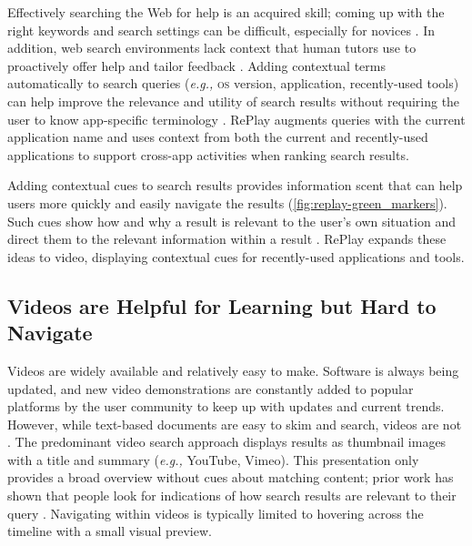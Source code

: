 Effectively searching the Web for help is an acquired skill; coming up with the right keywords and search settings can be difficult, especially for novices \cite{Russell2011}. In addition, web search environments lack context that human tutors use to proactively offer help and tailor feedback \cite{Schon1983}. Adding contextual terms automatically to search queries (\textit{e.g.,} \textsc{os} version, application, recently-used tools) can help improve the relevance and utility of search results without requiring the user to know app-specific terminology \cite{Ekstrand2011, Brandt2010, Matejka2011a}. RePlay augments queries with the current application name and uses context from both the current and recently-used applications to support cross-app activities when ranking search results.

Adding contextual cues to search results provides information scent that can help users more quickly and easily navigate the results (\autoref{fig:replay-green_markers}). Such cues show how and why a result is relevant to the user's own situation and direct them to the relevant information within a result \cite{Ekstrand2011, Fourney2014Intertwine}. RePlay expands these ideas to video, displaying contextual cues for recently-used applications and tools.


\subsection{Videos are Helpful for Learning but Hard to Navigate}
Videos are widely available and relatively easy to make. Software is always being updated, and new video demonstrations are constantly added to popular platforms by the user community to keep up with updates and current trends. However, while text-based documents are easy to skim and search, videos are not \cite{Pavel2014, Pavel2015, Kim2014}. The predominant video search approach displays results as thumbnail images with a title and summary (\textit{e.g.,} YouTube, Vimeo). This presentation only provides a broad overview without cues about matching content; prior work has shown that people look for indications of how search results are relevant to their query \cite{Hearst2009Book}. Navigating within videos is typically limited to hovering across the timeline with a small visual preview.

